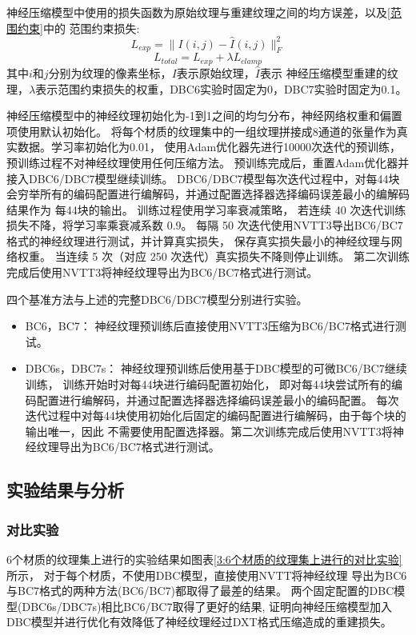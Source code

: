 神经压缩模型中使用的损失函数为原始纹理与重建纹理之间的均方误差，以及\ref{范围约束}中的
范围约束损失:
\begin{equation}
    L_{exp}=\| I(i,j) - \hat{I}(i,j) \|^2_F
\end{equation}
\begin{equation}
    L_{total}=L_{exp}+\lambda L_{clamp}
\end{equation}
其中$i$和$j$分别为纹理的像素坐标，$I$表示原始纹理，$\hat{I}$表示
神经压缩模型重建的纹理，$\lambda$表示范围约束损失的权重，DBC6实验时固定为0，DBC7实验时固定为0.1。

神经压缩模型中的神经纹理初始化为-1到1之间的均匀分布，神经网络权重和偏置项使用默认初始化。
将每个材质的纹理集中的一组纹理拼接成8通道的张量作为真实数据。学习率初始化为0.01，
使用Adam优化器先进行10000次迭代的预训练，预训练过程不对神经纹理使用任何压缩方法。
预训练完成后，重置Adam优化器并接入DBC6/DBC7模型继续训练。
DBC6/DBC7模型每次迭代过程中，对每4\times4块会穷举所有的编码配置进行编解码，并通过配置选择器选择编码误差最小的编解码结果作为
每4\times4块的输出。
训练过程使用学习率衰减策略，
若连续 40 次迭代训练损失不降，将学习率乘衰减系数 0.9。
每隔 50 次迭代使用NVTT3导出BC6/BC7格式的神经纹理进行测试，并计算真实损失，
保存真实损失最小的神经纹理与网络权重。
当连续 5 次（对应 250 次迭代）真实损失不降则停止训练。
第二次训练完成后使用NVTT3将神经纹理导出为BC6/BC7格式进行测试。

四个基准方法与上述的完整DBC6/DBC7模型分别进行实验。

\begin{itemize}
    \item BC6，BC7： 神经纹理预训练后直接使用NVTT3压缩为BC6/BC7格式进行测试。
    \item DBC6s，DBC7s： 神经纹理预训练后使用基于DBC模型的可微BC6/BC7继续训练，
    训练开始时对每4\times4块进行编码配置初始化，
    即对每4\times4块尝试所有的编码配置进行编解码，并通过配置选择器选择编码误差最小的编码配置。
    每次迭代过程中对每4\times4块使用初始化后固定的编码配置进行编解码，由于每个块的输出唯一，因此
    不需要使用配置选择器。第二次训练完成后使用NVTT3将神经纹理导出为BC6/BC7格式进行测试。
\end{itemize}

\subsection{实验结果与分析}

\subsubsection{对比实验}
\label{3:对比实验}
6个材质的纹理集上进行的实验结果如图表\ref{3:6个材质的纹理集上进行的对比实验}所示，
对于每个材质，不使用DBC模型，直接使用NVTT将神经纹理
导出为BC6与BC7格式的两种方法(BC6/BC7)都取得了最差的结果。
两个固定配置的DBC模型(DBC6s/DBC7s)相比BC6/BC7取得了更好的结果,
证明向神经压缩模型加入DBC模型并进行优化有效降低了神经纹理经过DXT格式压缩造成的重建损失。

